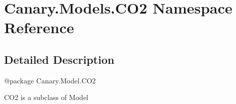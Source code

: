 \hypertarget{namespace_canary_1_1_models_1_1_c_o2}{\section{Canary.\-Models.\-C\-O2 Namespace Reference}
\label{namespace_canary_1_1_models_1_1_c_o2}
}


\subsection{Detailed Description}
\begin{DoxyVerb}@package Canary.Model.CO2

CO2 is a subclass of Model
\end{DoxyVerb}
 